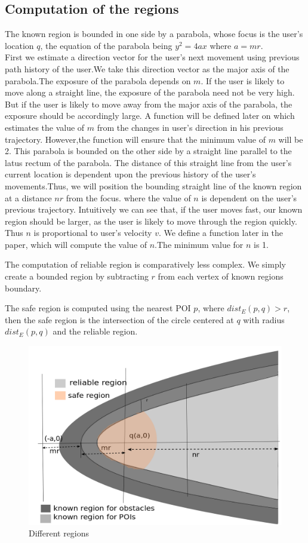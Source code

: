 \subsection{Computation of the regions}
The known region is bounded in one side by a parabola, whose focus is the user's location $q$, the equation of the parabola being $y^2=4ax $ where $ a=mr$.\\
First we estimate a direction vector for the user's next movement using previous path history of the user.We take this direction vector as the major axis of the parabola.The exposure of the parabola depends on $m$. If the user is likely to move along a straight line, the exposure of the parabola need not be very high. But if the user is likely to move away from the major axis of the parabola, the exposure should be accordingly large.  A function will be defined later on which estimates the value of $m$ from the changes in user's direction in his previous trajectory. However,the function will ensure that the minimum value of $m$ will be 2. This parabola is bounded on the other side by a straight line parallel to the latus rectum of the parabola. The distance of this straight line from the user's current location is dependent upon the previous history of the user's movements.Thus, we will position the bounding straight line of the known region at a distance $ nr $ from the focus. where the value of $n$ is dependent on the user's previous trajectory. Intuitively we can see that, if the user moves fast, our known region should be larger, as the user is likely to move through the region quickly. Thus $n$ is proportional to user's velocity $v$. We define a function later in the paper, which will compute the value of $n$.The minimum value for $n$ is 1.

The computation of reliable region is comparatively less complex. We simply create a bounded region by subtracting $r$ from each vertex of known regions boundary. 

The safe region is computed using the nearest POI $p$, where $dist_E(p,q)>r$, then the safe region is the intersection of the circle centered at $q$ with radius $dist_E(p,q)$ and the reliable region.

\begin{figure}[h]
  \includegraphics[width=\linewidth]{regions_def.png}
  \caption{Different regions}
  \label{fig:regions}
\end{figure}


